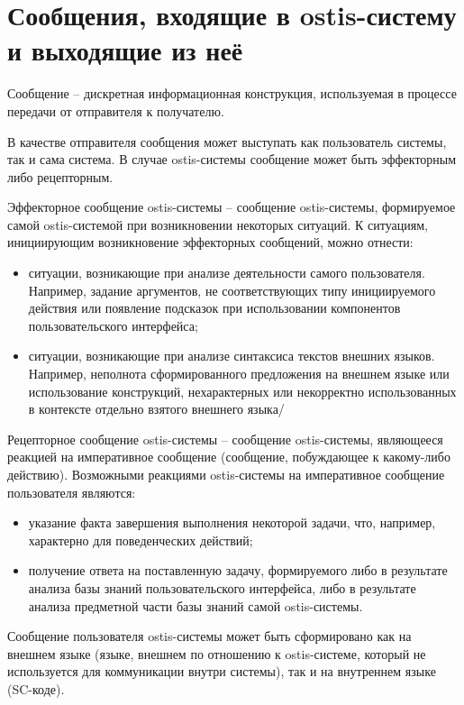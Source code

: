 \section{Сообщения, входящие в ostis-систему и выходящие из неё}

Сообщение -- дискретная информационная конструкция, используемая в процессе передачи от отправителя к получателю.

В качестве отправителя сообщения может выступать как пользователь системы, так и сама система. В случае ostis-системы сообщение может быть эффекторным либо рецепторным.

Эффекторное сообщение ostis-системы -- сообщение ostis-системы, формируемое самой ostis-системой при возникновении некоторых ситуаций. К ситуациям, инициирующим возникновение эффекторных сообщений, можно отнести:
\begin{itemize}
	\item ситуации, возникающие при анализе деятельности самого пользователя. Например, задание аргументов, не соответствующих типу инициируемого действия или появление подсказок при использовании компонентов пользовательского интерфейса;
	\item ситуации, возникающие при анализе синтаксиса текстов внешних языков. Например, неполнота сформированного предложения на внешнем языке или использование конструкций, нехарактерных или некорректно использованных в контексте отдельно взятого внешнего языка/
\end{itemize}

Рецепторное сообщение ostis-системы -- сообщение ostis-системы, являющееся реакцией на императивное сообщение (сообщение, побуждающее к какому-либо действию). Возможными реакциями ostis-системы на императивное сообщение пользователя являются:
\begin{itemize}
	\item указание факта завершения выполнения некоторой задачи, что, например, характерно для поведенческих действий;
	\item получение ответа на поставленную задачу, формируемого либо в результате анализа базы знаний	пользовательского интерфейса, либо в результате анализа предметной части базы знаний самой ostis-системы.
\end{itemize}

Сообщение пользователя ostis-системы может быть сформировано как на внешнем языке (языке, внешнем по отношению к ostis-системе, который не используется для коммуникации внутри системы), так и на внутреннем языке (SC-коде).

